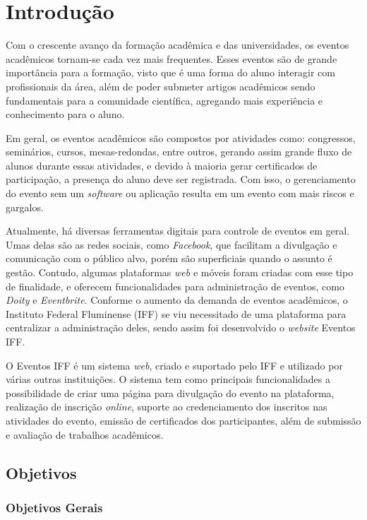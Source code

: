 \chapter{Introdução}

Com o crescente avanço da formação acadêmica e das universidades, os eventos acadêmicos tornam-se cada vez mais frequentes. Esses eventos são de grande importância para a formação, visto que é uma forma do aluno interagir com profissionais da área, além de poder submeter artigos acadêmicos sendo fundamentais para a comunidade científica, agregando mais experiência e conhecimento para o aluno.

Em geral, os eventos acadêmicos são compostos por atividades como: congressos, seminários, cursos, mesas-redondas, entre outros, gerando assim grande fluxo de alunos durante essas atividades, e devido à maioria gerar certificados de participação, a presença do aluno deve ser registrada. Com isso, o gerenciamento do evento sem um \textit{software} ou aplicação resulta em um evento com mais riscos e gargalos. 

Atualmente, há diversas ferramentas digitais para controle de eventos em geral. Umas delas são as redes sociais, como \textit{Facebook}, que facilitam a divulgação e comunicação com o público alvo, porém são superficiais quando o assunto é gestão. Contudo, algumas plataformas \textit{web} e móveis foram criadas com esse tipo de finalidade, e oferecem funcionalidades para administração de eventos, como \textit{Doity} e \textit{Eventbrite}. Conforme o aumento da demanda de eventos acadêmicos, o Instituto Federal Fluminense (IFF) se viu necessitado de uma plataforma para centralizar a administração deles, sendo assim foi desenvolvido o \textit{website} Eventos IFF.

O Eventos IFF é um sistema \textit{web}, criado e suportado pelo IFF e utilizado por várias outras instituições. O sistema tem como principais funcionalidades a possibilidade de criar uma página para divulgação do evento na plataforma, realização de inscrição \textit{online}, suporte ao credenciamento dos inscritos nas atividades do evento, emissão de certificados dos participantes, além de submissão e avaliação de trabalhos acadêmicos.

\section{Objetivos}
\subsection{Objetivos Gerais}

